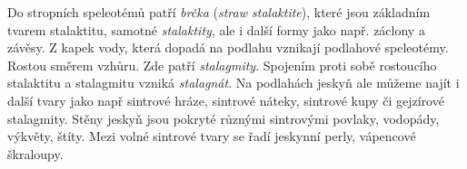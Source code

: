 Do stropních speleotémů patří \emph{brčka} (\textit{straw stalaktite}), které jsou základním tvarem stalaktitu, samotné \emph{stalaktity}, ale i další formy jako např. záclony a závěsy. Z kapek vody, která dopadá na podlahu vznikají podlahové speleotémy. Rostou směrem vzhůru. Zde patří \emph{stalagmity}. Spojením proti sobě rostoucího stalaktitu a stalagmitu vzniká \emph{stalagnát}. Na podlahách jeskyň ale můžeme najít i další tvary jako např sintrové hráze, sintrové náteky, sintrové kupy či gejzírové stalagmity. Stěny jeskyň jsou pokryté různými sintrovými povlaky, vodopády, výkvěty, štíty. Mezi volné sintrové tvary se řadí jeskynní perly, vápencové škraloupy.


%		
%
%	
